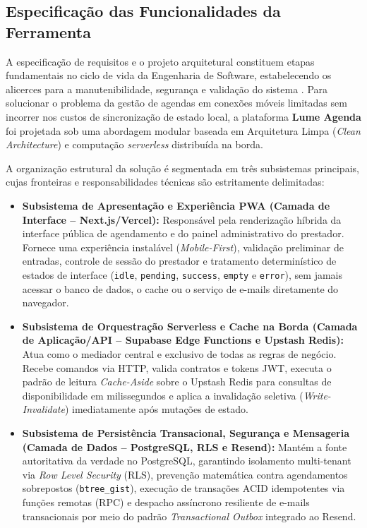 \documentclass[12pt,a4paper]{article}
\begin{document}
\subsection{Especificação das Funcionalidades da Ferramenta}
\label{subsec:especificacao_funcionalidades}

A especificação de requisitos e o projeto arquitetural constituem etapas fundamentais no ciclo de vida da Engenharia de Software, estabelecendo os alicerces para a manutenibilidade, segurança e validação do sistema \cite{pressman2021}. Para solucionar o problema da gestão de agendas em conexões móveis limitadas sem incorrer nos custos de sincronização de estado local, a plataforma \textbf{Lume Agenda} foi projetada sob uma abordagem modular baseada em Arquitetura Limpa (\textit{Clean Architecture}) e computação \textit{serverless} distribuída na borda.

A organização estrutural da solução é segmentada em três subsistemas principais, cujas fronteiras e responsabilidades técnicas são estritamente delimitadas:

\begin{itemize}
    \item \textbf{Subsistema de Apresentação e Experiência PWA (Camada de Interface -- Next.js/Vercel):} Responsável pela renderização híbrida da interface pública de agendamento e do painel administrativo do prestador. Fornece uma experiência instalável (\textit{Mobile-First}), validação preliminar de entradas, controle de sessão do prestador e tratamento determinístico de estados de interface (\texttt{idle}, \texttt{pending}, \texttt{success}, \texttt{empty} e \texttt{error}), sem jamais acessar o banco de dados, o cache ou o serviço de e-mails diretamente do navegador.
    \item \textbf{Subsistema de Orquestração Serverless e Cache na Borda (Camada de Aplicação/API -- Supabase Edge Functions e Upstash Redis):} Atua como o mediador central e exclusivo de todas as regras de negócio. Recebe comandos via HTTP, valida contratos e tokens JWT, executa o padrão de leitura \textit{Cache-Aside} sobre o Upstash Redis para consultas de disponibilidade em milissegundos e aplica a invalidação seletiva (\textit{Write-Invalidate}) imediatamente após mutações de estado.
    \item \textbf{Subsistema de Persistência Transacional, Segurança e Mensageria (Camada de Dados -- PostgreSQL, RLS e Resend):} Mantém a fonte autoritativa da verdade no PostgreSQL, garantindo isolamento multi-tenant via \textit{Row Level Security} (RLS), prevenção matemática contra agendamentos sobrepostos (\texttt{btree\_gist}), execução de transações ACID idempotentes via funções remotas (RPC) e despacho assíncrono resiliente de e-mails transacionais por meio do padrão \textit{Transactional Outbox} integrado ao Resend.
\end{itemize}
\end{document}
